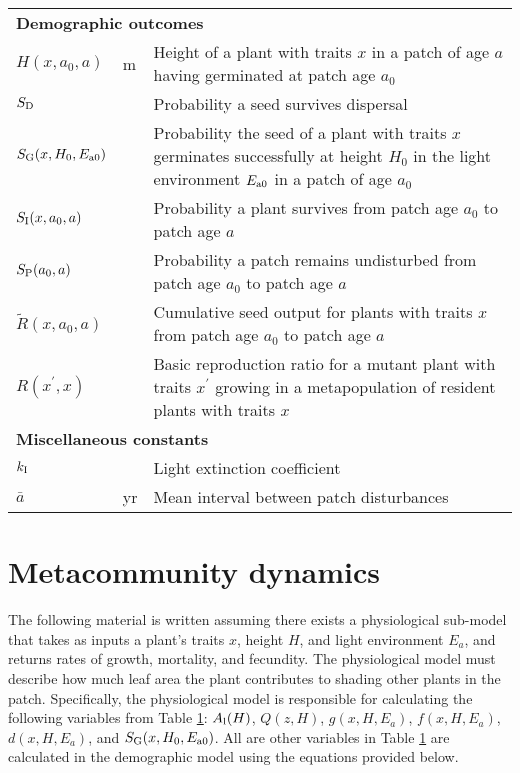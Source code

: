 \documentclass[10pt,twoside]{article}
\begin{document}
\begin{table}[ht]
\begin{tabular}{p{2cm}p{2cm}p{9cm}}
\multicolumn{3}{l}{\textbf{Demographic outcomes}} \\
$H(x, a_0, a)$ & m & Height of a plant with traits $x$ in a patch of age $a$ having germinated at patch age $a_0$\\
$S_{\rm D}$ & & Probability a seed survives dispersal \\
$S_{\rm G} (x, H_0, E_{{\rm a}0})$ & & Probability the seed of a plant with traits $x$ germinates successfully at height $H_0$ in the light environment $E_{{\rm a}0}$ in a patch of age $a_0$\\
$S_{\rm I} (x, a_0, a)$ & & Probability a plant survives from patch age $a_0$ to patch age $a$\\
$S_{\rm P} ( a_0, a)$ & & Probability a patch remains undisturbed from patch age $a_0$ to patch age $a$\\
$\tilde{R}(x, a_0, a)$ & & Cumulative seed output for plants with traits $x$ from patch age $a_0$ to patch age $a$ \\
$R\left(x^\prime, x\right)$ & & Basic reproduction ratio for a mutant plant with traits $x^\prime$ growing in a metapopulation of resident plants with traits $x$\\

\multicolumn{3}{l}{\textbf{Miscellaneous constants}} \\
$k_{\rm I}$ & & Light extinction coefficient\\
$\bar{a}$ & yr & Mean interval between patch disturbances \\
\hline
\end{tabular}
\label{tab:definitions}
\end{table}

\section{Metacommunity dynamics}\label{system-dynamics}

The following material is written assuming there exists a physiological sub-model
that takes as inputs a plant's traits $x$, height $H$, and light environment $E_a$,
and returns rates of growth, mortality, and fecundity. The physiological model must
describe how much leaf area the plant contributes to shading other plants in the patch.
Specifically, the physiological model is responsible for calculating the following
variables from Table \ref{tab:definitions}:
$A_{\rm l}(H)$, $Q(z, H)$, $g(x, H, E_a)$, $f(x, H, E_a)$, $d(x, H, E_a)$, and
$S_{\rm G} (x, H_0, E_{{\rm a}0})$.
All are other variables in Table \ref{tab:definitions} are calculated in the
demographic model using the equations provided below.
\end{document}
